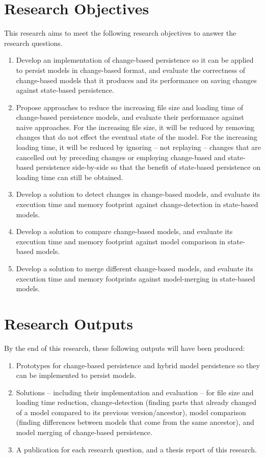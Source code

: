 \documentclass[12pt, a4paper]{report} \usepackage[titletoc]{appendix}
\begin{document}
\section{Research Objectives}
\label{sec:research_objectives}
This research aims to meet the following research objectives to answer the research questions.
\begin{enumerate}
	\item Develop an implementation of change-based persistence so it can be applied to persist models in change-based format, and evaluate the correctness of change-based models that it produces and its performance on saving changes against state-based persistence. 
	\item Propose approaches to reduce the increasing file size and loading time of change-based persistence models, and evaluate their performance against naive approaches. For the increasing file size, it will be reduced by removing changes that do not effect the eventual state of the model. For the increasing loading time, it will be reduced by ignoring -- not replaying -- changes that are cancelled out by preceding changes or employing change-based and state-based persistence side-by-side so that the benefit of state-based persistence on loading time can still be obtained.    
    \item Develop a solution to detect changes in change-based models, and evaluate its execution time and memory footprint against change-detection in state-based models.
	\item Develop a solution to compare change-based models, and evaluate its execution time and memory footprint against model comparison in state-based models.
	\item Develop a solution to merge different change-based models, and evaluate its execution time and memory footprints against model-merging in state-based models. 
\end{enumerate}

\section{Research Outputs}
\label{sec:research_outputs}
By the end of this research, these following outputs will have been produced:
\begin{enumerate}
	\item Prototypes for change-based persistence and hybrid model persistence so they can be implemented to persist models. 
	\item Solutions -- including their implementation and evaluation -- for file size and loading time reduction, change-detection (finding parts that already changed of a model compared to its previous version/ancestor), model comparison (finding differences between models that come from the same ancestor), and model merging of change-based persistence.
	\item A publication for each research question, and a thesis report of this research. 
\end{enumerate}
\end{document}
